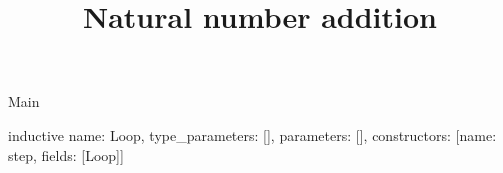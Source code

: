 \begin{lexlean}{Main}
\title{Natural number addition}
\begin{semanticmodule}
inductive{
  name: Loop,
  type_parameters: [],
  parameters: [],
  constructors: [{name: step, fields: [Loop]}]
}
\end{semanticmodule}
\end{lexlean}
